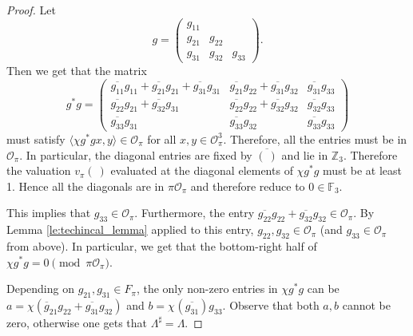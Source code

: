\documentclass{eptcs}
\theoremstyle{remark}
\theoremstyle{definition}
\newcommand{\dual}[1]{{#1}^{\sharp}}
\begin{document}
\begin{proof}
    Let 
    \begin{equation}
        g = 
	\begin{pmatrix}
	    g_{11} & & \\ 
	    g_{21} & g_{22} & \\ 
	    g_{31} & g_{32} & g_{33}
	\end{pmatrix}.
    \end{equation}
    Then we get that the matrix
    \begin{equation}
        g^{*} g =  
	\begin{pmatrix}
	    \overline{g_{11}}g_{11} + 
	    \overline{g_{21}}g_{21} + 
	    \overline{g_{31}}g_{31}  
	    & 
 \overline{g_{21}} g_{22} 
 + \overline{g_{31}} g_{32} 
	    & 
	    \overline{g_{31}} g_{33} 
	     \\ 
	     \overline{g_{22}}g_{21} +  \overline{g_{32}}g_{31}
	    & 
	    \overline{g_{22}} g_{22} + \overline{g_{32}}g_{32}
	    & 
\overline{g_{32}} g_{33}
	     \\ 
	    \overline{g_{33}} g_{31} 
	    & 
	    \overline{g_{33}} g_{32}
	    & 
	    \overline{g_{33}} g_{33}
	\end{pmatrix}
    \end{equation}
    must satisfy $ \langle \chi g^*g x ,  y \rangle \in \mathcal{O}_{\pi}$ for all $x,y \in \mathcal{O}_{\pi}^{3}$. 
    Therefore, all the entries must be in $\mathcal{O}_{\pi}$. 
    In particular, the diagonal entries are fixed by $\overline{( \ )}$ and lie in $\mathbb{Z}_{3}$. 
    Therefore the valuation $v_\pi(\ )$ evaluated at the diagonal elements of $\chi g^{*}g$ must be at least 1. Hence all the diagonals are in $\pi \mathcal{O}_{\pi}$ and therefore reduce to $0 \in \mathbb{F}_{3}$.
    
    This implies that $g_{33} \in \mathcal{O}_{\pi}$. 
    Furthermore, the entry $\overline{g_{22}} g_{22} + \overline{g_{32}}g_{32} \in \mathcal{O}_{\pi}$. By Lemma \ref{le:techincal_lemma} applied to this entry, $g_{22} , g_{32} \in \mathcal{O}_{\pi}$ (and $g_{33}\in\mathcal{O}_{\pi}$ from above). In particular, we get that the bottom-right half of $\chi g^{*}g = 0 \pmod{\pi \mathcal{O}_{\pi}}$. 

    Depending on $g_{21},g_{31} \in F_{\pi}$, the only non-zero entries in $\chi g^{*} g$ can be 
    $a = \chi( \overline{g}_{21} g_{22} + \overline{g_{31}} g_{32})$ and
    $b=\chi^{}(\overline{g_{31}}  )g_{33}$. Observe that both $a,b$ cannot be zero, otherwise one gets that $\dual{\Lambda} = \Lambda$.


\end{proof}
\end{document}
